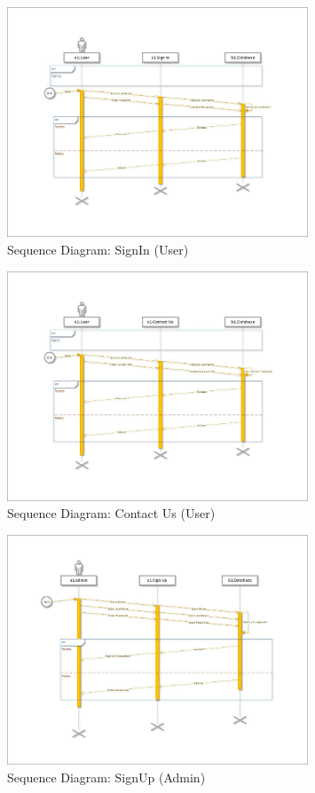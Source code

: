 \documentclass[12pt]{report}
\begin{document}
\begin{figure}[ht]
    \centering
    \includegraphics[width=0.8\textwidth]{Media/s1_Page_26.jpg} %
    \caption{Sequence Diagram: SignIn (User)}
    \label{fig:drawing1}
\end{figure}

\begin{figure}[ht]
    \centering
    \includegraphics[width=0.8\textwidth]{Media/s1_Page_27.jpg} %
    \caption{Sequence Diagram: Contact Us (User)}
    \label{fig:drawing1}
\end{figure}



\begin{figure}[ht]
    \centering
    \includegraphics[width=0.8\textwidth]{Media/s1_Page_29.jpg} %
    \caption{Sequence Diagram: SignUp (Admin)}
    \label{fig:drawing1}
\end{figure}
\end{document}

